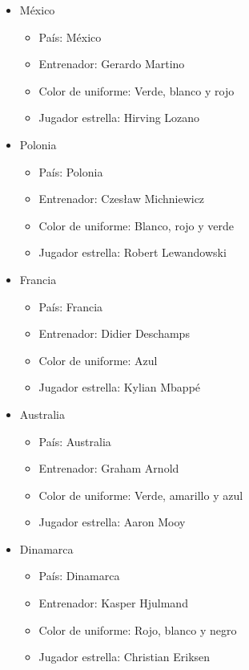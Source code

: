\begin{itemize}
\begin{itemize}
        \end{itemize}
    \item México
        \begin{itemize}
            \item País: México
            \item Entrenador: Gerardo Martino
            \item Color de uniforme: Verde, blanco y rojo
            \item Jugador estrella: Hirving Lozano
        \end{itemize}
    \item Polonia
        \begin{itemize}
            \item País: Polonia
            \item Entrenador: Czesław Michniewicz
            \item Color de uniforme: Blanco, rojo y verde
            \item Jugador estrella: Robert Lewandowski
        \end{itemize}
    \item Francia
        \begin{itemize}
            \item País: Francia
            \item Entrenador: Didier Deschamps
            \item Color de uniforme: Azul
            \item Jugador estrella: Kylian Mbappé
        \end{itemize}
    \item Australia
        \begin{itemize}
            \item País: Australia
            \item Entrenador: Graham Arnold
            \item Color de uniforme: Verde, amarillo y azul
            \item Jugador estrella: Aaron Mooy
        \end{itemize}
    \item Dinamarca
        \begin{itemize}
            \item País: Dinamarca
            \item Entrenador: Kasper Hjulmand
            \item Color de uniforme: Rojo, blanco y negro
            \item Jugador estrella: Christian Eriksen

\end{itemize}
\end{itemize}
